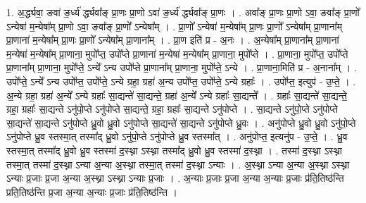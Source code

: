 \documentclass[17pt]{extarticle}
\begin{document}
1. अ॒र्द्ध्यवा॒ ङवा॑ ङ॒र्ध्य॑ र्द्ध्यवा᳚ङ् प्रा॒णः प्रा॒णो ऽवा॑ ङ॒र्ध्य॑ र्द्ध्यवा᳚ङ् प्रा॒णः । . अवा᳚ङ् प्रा॒णः प्रा॒णो ऽवा॒ ङवा᳚ङ् प्रा॒णो᳚ ऽन्येषा॑ म॒न्येषा᳚म् प्रा॒णो ऽवा॒ ङवा᳚ङ् प्रा॒णो᳚ ऽन्येषा᳚म् । . प्रा॒णो᳚ ऽन्येषा॑ म॒न्येषा᳚म् प्रा॒णः प्रा॒णो᳚ ऽन्येषा᳚म् प्रा॒णाना᳚म् प्रा॒णाना॑ म॒न्येषा᳚म् प्रा॒णः प्रा॒णो᳚ ऽन्येषा᳚म् प्रा॒णाना᳚म् । . प्रा॒ण इति॑ प्र - अ॒नः । . अ॒न्येषा᳚म् प्रा॒णाना᳚म् प्रा॒णाना॑ म॒न्येषा॑ म॒न्येषा᳚म् प्रा॒णाना॒ मुपो᳚प्त॒ उपो᳚प्ते प्रा॒णाना॑ म॒न्येषा॑ म॒न्येषा᳚म् प्रा॒णाना॒ मुपो᳚प्ते । . प्रा॒णाना॒ मुपो᳚प्त॒ उपो᳚प्ते प्रा॒णाना᳚म् प्रा॒णाना॒ मुपो᳚प्ते॒ ऽन्ये᳚ ऽन्य उपो᳚प्ते प्रा॒णाना᳚म् प्रा॒णाना॒ मुपो᳚प्ते॒ ऽन्ये । . प्रा॒णाना॒मिति॑ प्र - अ॒नाना᳚म् । . उपो᳚प्ते॒ ऽन्ये᳚ ऽन्य उपो᳚प्त॒ उपो᳚प्ते॒ ऽन्ये ग्रहा॒ ग्रहा॑ अ॒न्य उपो᳚प्त॒ उपो᳚प्ते॒ ऽन्ये ग्रहाः᳚ । . उपो᳚प्त॒ इत्युप॑ - उ॒प्ते॒ । . अ॒न्ये ग्रहा॒ ग्रहा॑ अ॒न्ये᳚ ऽन्ये ग्रहाः᳚ सा॒द्यन्ते॑ सा॒द्यन्ते॒ ग्रहा॑ अ॒न्ये᳚ ऽन्ये ग्रहाः᳚ सा॒द्यन्ते᳚ । . ग्रहाः᳚ सा॒द्यन्ते॑ सा॒द्यन्ते॒ ग्रहा॒ ग्रहाः᳚ सा॒द्यन्ते ऽनु॑पो॒प्ते ऽनु॑पोप्ते सा॒द्यन्ते॒ ग्रहा॒ ग्रहाः᳚ सा॒द्यन्ते ऽनु॑पोप्ते । . सा॒द्यन्ते ऽनु॑पो॒प्ते ऽनु॑पोप्ते सा॒द्यन्ते॑ सा॒द्यन्ते ऽनु॑पोप्ते ध्रु॒वो ध्रु॒वो ऽनु॑पोप्ते सा॒द्यन्ते॑ सा॒द्यन्ते ऽनु॑पोप्ते ध्रु॒वः । . अनु॑पोप्ते ध्रु॒वो ध्रु॒वो ऽनु॑पो॒प्ते ऽनु॑पोप्ते ध्रु॒व स्तस्मा॒त् तस्मा᳚द् ध्रु॒वो ऽनु॑पो॒प्ते ऽनु॑पोप्ते ध्रु॒व स्तस्मा᳚त् । . अनु॑पोप्त॒ इत्यनु॑प - उ॒प्ते॒ । . ध्रु॒व स्तस्मा॒त् तस्मा᳚द् ध्रु॒वो ध्रु॒व स्तस्मा॑ द॒स्थ्ना ऽस्थ्ना तस्मा᳚द् ध्रु॒वो ध्रु॒व स्तस्मा॑ द॒स्थ्ना । . तस्मा॑ द॒स्थ्ना ऽस्थ्ना तस्मा॒त् तस्मा॑ द॒स्थ्ना ऽन्या अ॒न्या अ॒स्थ्ना तस्मा॒त् तस्मा॑ द॒स्थ्ना ऽन्याः । . अ॒स्थ्ना ऽन्या अ॒न्या अ॒स्थ्ना ऽस्थ्ना ऽन्याः प्र॒जाः प्र॒जा अ॒न्या अ॒स्थ्ना ऽस्थ्ना ऽन्याः प्र॒जाः । . अ॒न्याः प्र॒जाः प्र॒जा अ॒न्या अ॒न्याः प्र॒जाः प्र॑ति॒तिष्ठ॑न्ति प्रति॒तिष्ठ॑न्ति प्र॒जा अ॒न्या अ॒न्याः प्र॒जाः प्र॑ति॒तिष्ठ॑न्ति । \newline
\end{document}
